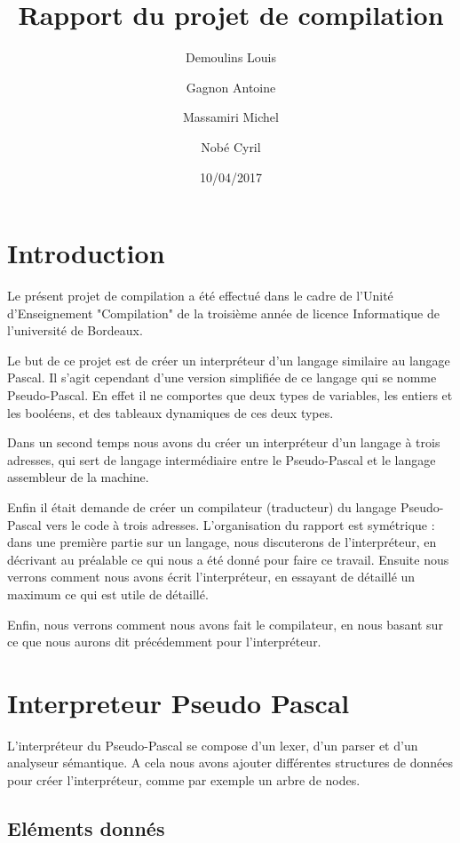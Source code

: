 \documentclass{article}
\title{Rapport du projet de compilation}
\date{10/04/2017}
\author{Demoulins Louis \and Gagnon Antoine \and Massamiri Michel \and Nobé Cyril}
\begin{document}
\maketitle
\newpage

\tableofcontents

\newpage
\section{Introduction}

Le présent projet de compilation a été effectué dans le cadre de l'Unité d'Enseignement "Compilation" de la troisième année de licence Informatique de l'université de Bordeaux.

\medbreak

Le but de ce projet est de créer un interpréteur d'un langage similaire au langage Pascal. Il s'agit cependant d'une version simplifiée de ce langage qui se nomme Pseudo-Pascal.
En effet il ne comportes que deux types de variables, les entiers et les booléens, et des tableaux dynamiques de ces deux types.

Dans un second temps nous avons du créer un interpréteur d'un langage à trois adresses, qui sert de langage intermédiaire entre le Pseudo-Pascal et le langage assembleur de la machine.

Enfin il était demande de créer un compilateur (traducteur) du langage Pseudo-Pascal vers le code à trois adresses.
\bigbreak
L'organisation du rapport est symétrique : dans une première partie sur un langage, nous discuterons de l'interpréteur, en décrivant au préalable ce qui nous a été donné pour faire ce travail.
Ensuite nous verrons comment nous avons écrit l'interpréteur, en essayant de détaillé un maximum ce qui est utile de détaillé.

Enfin, nous verrons comment nous avons fait le compilateur, en nous basant sur ce que nous aurons dit précédemment pour l'interpréteur.

\newpage
\section{Interpreteur Pseudo Pascal}

L'interpréteur du Pseudo-Pascal se compose d'un lexer, d'un parser et d'un analyseur sémantique. A cela nous avons ajouter différentes structures de données pour créer l'interpréteur, comme par exemple un arbre de nodes.

\subsection{Eléments donnés}
\end{document}
